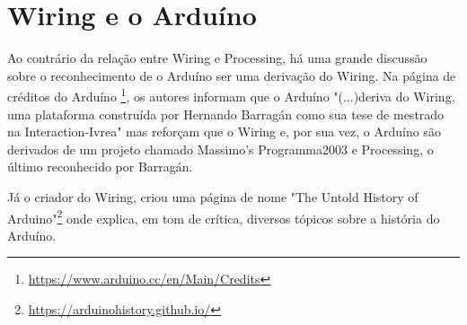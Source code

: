 \section{Wiring e o Arduíno}

Ao contrário da relação entre Wiring e Processing, há uma grande discussão sobre o reconhecimento de o Arduíno ser uma derivação do Wiring.
Na página de créditos do Arduíno \footnote{\url{https://www.arduino.cc/en/Main/Credits}}, os autores informam que o Arduíno "(...)deriva do Wiring, uma plataforma construída por Hernando Barragán como sua tese de mestrado na Interaction-Ivrea" mas reforçam que o Wiring e, por sua vez, o Arduíno são derivados de um projeto chamado Massimo's Programma2003 e Processing, o último reconhecido por Barragán. 

Já o criador do Wiring, criou uma página de nome "The Untold History of Arduino"\footnote{\url{https://arduinohistory.github.io/}} onde explica, em tom de crítica, diversos tópicos sobre a história do Arduíno.

